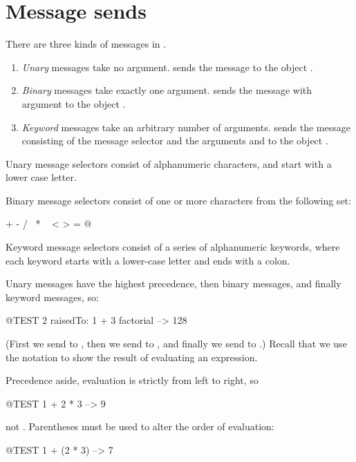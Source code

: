 \documentclass[a4paper,10pt,twoside]{book}
\begin{document}
\section{Message sends}

There are three kinds of messages in \sq.
\begin{enumerate}
  \item \emph{Unary} messages take no argument.
   sends the message  to the object .
  \item \emph{Binary} messages take exactly one argument.
  	 sends the message \ct{+} with argument  to the object .
  \item \emph{Keyword} messages take an arbitrary number of arguments.
  	 sends the message consisting of the message selector
	 and the arguments  and  to the object .
\end{enumerate}

Unary message selectors consist of alphanumeric characters, and start with a lower case letter.

Binary message selectors consist of one or more characters from the following set:
\begin{code}{}
+ - / \ * ~ < > = @ %
\end{code}
\noindent
Keyword message selectors consist of a series of alphanumeric keywords, where each keyword starts with a lower-case letter and ends with a colon.

Unary messages have the highest precedence, then binary messages, and finally keyword messages, so:
\begin{code}{@TEST}
2 raisedTo: 1 + 3 factorial --> 128
\end{code}
(First we send  to , then we send  to , and finally we send  to .)  
Recall that we use the notation \ct{-->} to show the result of evaluating an expression.

Precedence aside, evaluation is strictly from left to right, so
\begin{code}{@TEST}
1 + 2 * 3 --> 9
\end{code}
not .
Parentheses must be used to alter the order of evaluation:
\begin{code}{@TEST}
1 + (2 * 3) --> 7
\end{code}
\end{document}
